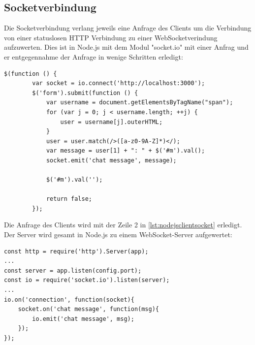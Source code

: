 \subsection{Socketverbindung}
Die Socketverbindung verlang jeweils eine Anfrage des Clients um die Verbindung von einer statuslosen HTTP Verbindung zu einer WebSocketverindung aufzuwerten. Dies ist in Node.js mit dem Modul "socket.io" mit einer Anfrag und er entgegennahme der Anfrage in wenige Schritten erledigt:

\begin{lstlisting}
$(function () {
        var socket = io.connect('http://localhost:3000');
        $('form').submit(function () {
            var username = document.getElementsByTagName("span");
            for (var j = 0; j < username.length; ++j) {
                user = username[j].outerHTML;
            }
            user = user.match(/>([a-z0-9A-Z]*)</);
            var message = user[1] + ": " + $('#m').val();
            socket.emit('chat message', message);

            $('#m').val('');

            return false;
        });
\end{lstlisting}
Die Anfrage des Clients wird mit der Zeile 2 in \ref{lst:nodejsclientsocket} erledigt.\\
Der Server wird gesamt in Node.js zu einem WebSocket-Server aufgewertet:


\begin{lstlisting}
const http = require('http').Server(app);
...
const server = app.listen(config.port);
const io = require('socket.io').listen(server);
...
io.on('connection', function(socket){
    socket.on('chat message', function(msg){
        io.emit('chat message', msg);
    });
});
\end{lstlisting}

